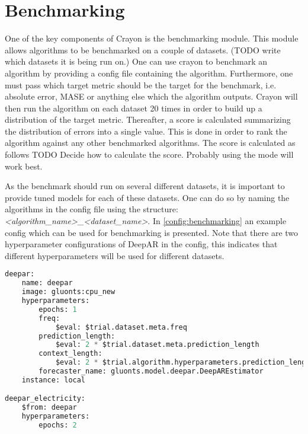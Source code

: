 \section{Benchmarking}
\label{subsec:benchmarking}
One of the key components of Crayon is the benchmarking module. This module allows algorithms to be benchmarked on a couple of datasets. (TODO write which datasets it is being run on.)
One can use crayon to benchmark an algorithm by providing a config file containing the algorithm. Furthermore, one must pass which target metric should be the target for the benchmark, i.e. absolute error, MASE or anything else which the algorithm outputs. Crayon will then run the algorithm on each dataset 20 times in order to build up a distribution of the target metric. Thereafter, a score is calculated summarizing the distribution of errors into a single value. This is done in order to rank the algorithm against any other benchmarked algorithms. The score is calculated as follows TODO Decide how to calculate the score. Probably using the mode will work best.

As the benchmark should run on several different datasets, it is important to provide tuned models for each of these datasets. One can do so by naming the algorithms in the config file using the structure:\textit{ <algorithm\_name>\_<dataset\_name>}. In \ref{config:benchmarking} an example config which can be used for benchmarking is presented. Note that there are two  hyperparameter configurations of DeepAR in the config, this indicates that different hyperparameters will be used for different datasets.

\begin{lstlisting}[language=Python, label={config:benchmarking}, caption=Config file for benchmarking using Crayon. Note that \textit{deepar\_electricity} has a different hyperparameter configuration thus these hyperparameters will be used when benchmarking the algorithm on the electricity dataset.]
deepar:
    name: deepar
    image: gluonts:cpu_new
    hyperparameters:
        epochs: 1
        freq:
            $eval: $trial.dataset.meta.freq
        prediction_length:
            $eval: 2 * $trial.dataset.meta.prediction_length
        context_length:
            $eval: 2 * $trial.algorithm.hyperparameters.prediction_length
        forecaster_name: gluonts.model.deepar.DeepAREstimator    
    instance: local

deepar_electricity:
    $from: deepar
    hyperparameters:
        epochs: 2
\end{lstlisting}


